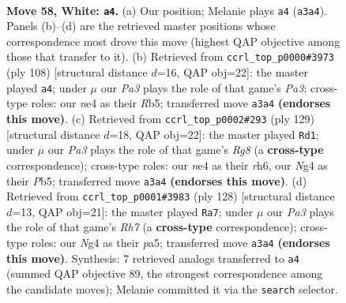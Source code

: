 \documentclass[11pt]{article}
\begin{document}
\clearpage

\begin{figure}[p]\centering
\begin{subfigure}{0.46\textwidth}\centering
\resizebox{\linewidth}{!}{%
\newchessgame
\chessboard[
  setfen={8/kb6/8/8/3pn1N1/PP4P1/8/1K6 w - - 1 58},
  showmover=false,
  pgfstyle=straightmove, color=movearrow, markmove={a3-a4}
]}
\caption{}
\end{subfigure}\hfill
\begin{subfigure}{0.46\textwidth}\centering
\resizebox{\linewidth}{!}{%
\newchessgame
\chessboard[
  setfen={8/8/4k3/1R2p3/7P/P4b2/3K2n1/8 w - - 1 55},
  showmover=false,
  pgfstyle=straightmove, color=movearrow, markmove={a3-a4}
]}
\caption{}
\end{subfigure}
\\[4pt]
\begin{subfigure}{0.46\textwidth}\centering
\resizebox{\linewidth}{!}{%
\newchessgame
\chessboard[
  setfen={2k5/8/7R/1p6/4KB1p/P7/8/6r1 b - - 5 65},
  showmover=false,
  pgfstyle=straightmove, color=movearrow, markmove={g1-d1}
]}
\caption{}
\end{subfigure}\hfill
\begin{subfigure}{0.46\textwidth}\centering
\resizebox{\linewidth}{!}{%
\newchessgame
\chessboard[
  setfen={8/7R/8/p1nkb3/P7/8/6P1/1K6 w - - 2 65},
  showmover=false,
  pgfstyle=straightmove, color=movearrow, markmove={h7-a7}
]}
\caption{}
\end{subfigure}
\caption{\textbf{Move 58, White: \texttt{a4}.} (a) Our position; Melanie plays \texttt{a4} (\texttt{a3a4}). Panels (b)--(d) are the retrieved master positions whose correspondence most drove this move (highest QAP objective among those that transfer to it). (b) Retrieved from \texttt{ccrl\_top\_p0000\#3973} (ply 108) [structural distance $d$=16, QAP obj=22]: the master played \texttt{a4}; under $\mu$ our \emph{Pa3} plays the role of that game's \emph{Pa3}; cross-type roles: our \emph{n}e4 as their \emph{R}b5; transferred move \texttt{a3a4} \textbf{(endorses this move)}. (c) Retrieved from \texttt{ccrl\_top\_p0002\#293} (ply 129) [structural distance $d$=18, QAP obj=22]: the master played \texttt{Rd1}; under $\mu$ our \emph{Pa3} plays the role of that game's \emph{Rg8} (a \textbf{cross-type} correspondence); cross-type roles: our \emph{n}e4 as their \emph{r}h6, our \emph{N}g4 as their \emph{P}b5; transferred move \texttt{a3a4} \textbf{(endorses this move)}. (d) Retrieved from \texttt{ccrl\_top\_p0001\#3983} (ply 128) [structural distance $d$=13, QAP obj=21]: the master played \texttt{Ra7}; under $\mu$ our \emph{Pa3} plays the role of that game's \emph{Rh7} (a \textbf{cross-type} correspondence); cross-type roles: our \emph{N}g4 as their \emph{p}a5; transferred move \texttt{a3a4} \textbf{(endorses this move)}. Synthesis: 7 retrieved analogs transferred to \texttt{a4} (summed QAP objective 89, the strongest correspondence among the candidate moves); Melanie committed it via the \texttt{search} selector.}
\label{fig:thought-m114}
\end{figure}
\end{document}

